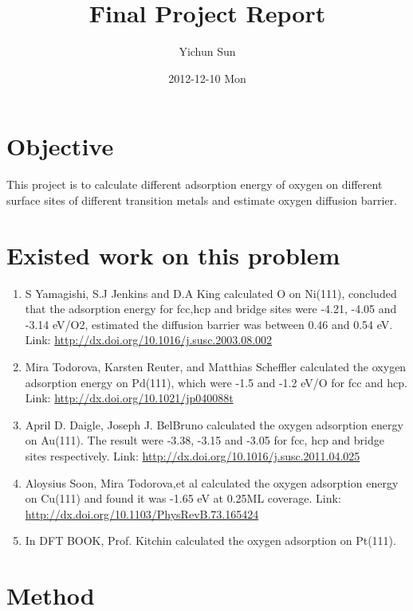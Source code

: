 \documentclass[11pt]{article}
\title{Final Project Report}
\author{Yichun Sun}
\date{2012-12-10 Mon}
\begin{document}
\maketitle

\setcounter{tocdepth}{3}
\tableofcontents
\vspace*{1cm}

\section{Objective}
\label{sec-1}

This project is to calculate different adsorption energy of oxygen on different surface sites of different transition metals and estimate oxygen diffusion barrier.
\section{Existed work on this problem}
\label{sec-2}

\begin{enumerate}
\item S Yamagishi, S.J Jenkins and D.A King calculated O on Ni(111), concluded that the adsorption energy for fcc,hcp and bridge sites were -4.21, -4.05 and -3.14 eV/O2, estimated the diffusion barrier was between 0.46 and 0.54 eV.
   Link: \href{http://dx.doi.org/10.1016/j.susc.2003.08.002}{http://dx.doi.org/10.1016/j.susc.2003.08.002}
\item Mira Todorova, Karsten Reuter, and Matthias Scheffler calculated the oxygen adsorption energy on Pd(111), which were -1.5 and -1.2 eV/O for fcc and hcp.
   Link: \href{http://dx.doi.org/10.1021/jp040088t}{http://dx.doi.org/10.1021/jp040088t}
\item April D. Daigle, Joseph J. BelBruno calculated the oxygen adsorption energy on Au(111). The result were -3.38, -3.15 and -3.05 for fcc, hcp and bridge sites respectively.
   Link: \href{http://dx.doi.org/10.1016/j.susc.2011.04.025}{http://dx.doi.org/10.1016/j.susc.2011.04.025}
\item Aloysius Soon, Mira Todorova,et al calculated the oxygen adsorption energy on Cu(111) and found it was -1.65 eV at 0.25ML coverage.
   Link: \href{http://dx.doi.org/10.1103/PhysRevB.73.165424}{http://dx.doi.org/10.1103/PhysRevB.73.165424}
\item In DFT BOOK, Prof. Kitchin calculated the oxygen adsorption on Pt(111).
\end{enumerate}
\section{Method}
\label{sec-3}
\end{document}
